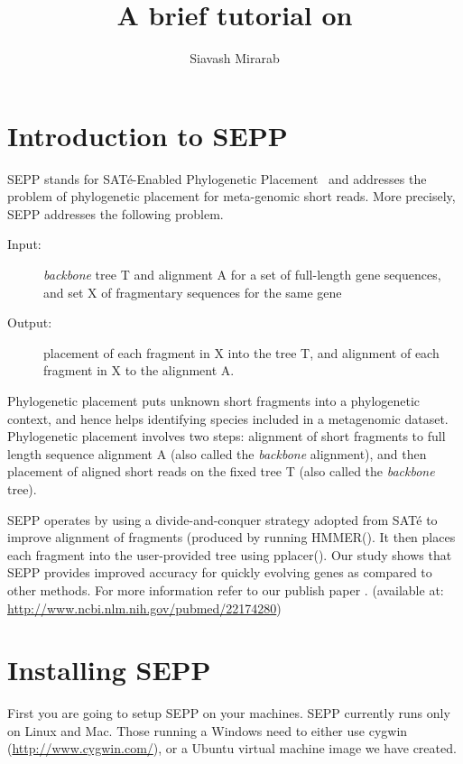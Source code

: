 \documentclass[11pt]{article} %
\title{A brief tutorial on \sepp }
\author{Siavash Mirarab}
\newcommand{\sepp}{SEPP\xspace}
\newcommand{\sate}{SAT\'{e}\xspace}
\newcommand{\pplacer}{pplacer\xspace}
\newcommand{\hmmer}{HMMER\xspace}
\begin{document}
\maketitle
\tableofcontents
\section{Introduction to \sepp}
\sepp stands for \sate-Enabled Phylogenetic Placement~\cite{sepp} and addresses the problem of phylogenetic placement for meta-genomic short reads. More precisely, \sepp addresses the following problem.

\begin{description}
\item [Input:] {\em backbone} tree T and alignment A for a set of full-length gene sequences, and set X of fragmentary sequences for the same gene

\item [Output:] placement of each fragment in X into the tree T, and alignment of each fragment in X to the alignment A.

\end{description}

Phylogenetic placement puts unknown short fragments into a phylogenetic context, and hence helps identifying species included in a metagenomic dataset.  
Phylogenetic placement involves two steps: alignment of short fragments to full length sequence alignment A (also called the {\em backbone} alignment), and then placement of aligned short reads on the fixed tree T (also called the {\em backbone} tree). 

\sepp operates by using a divide-and-conquer strategy adopted from \sate \cite{liu09science} to improve alignment of fragments (produced by running \hmmer (\cite{hmmer}). It then places each fragment into the user-provided tree using \pplacer (\cite{pplacer}). 
Our study shows that \sepp provides improved accuracy for quickly evolving genes as compared to other methods. For more information refer to our publish paper \cite{sepp}. (available at: \url{http://www.ncbi.nlm.nih.gov/pubmed/22174280})

\section{Installing \sepp}
First you are going to setup \sepp on your machines. \sepp currently runs only on Linux and Mac. Those running a Windows need to either use cygwin (\url{http://www.cygwin.com/}), or a Ubuntu virtual machine image we have created. 
 
\end{document}
